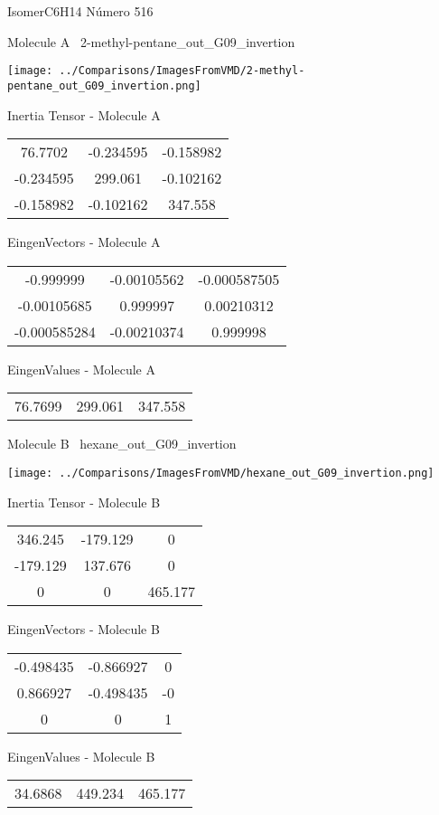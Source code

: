 \vtab[-3cm]
\begin{center}
{\large IsomerC6H14 \tab Número 516}
\end{center}
\begin{multicols}{2}
\begin{center}

Molecule A \
2-methyl-pentane\_out\_G09\_invertion

\texttt{[image: ../Comparisons/ImagesFromVMD/2-methyl-pentane\_out\_G09\_invertion.png]}

Inertia Tensor - Molecule A \\
\begin{tabular}{|c c c|}
76.7702	 & 	-0.234595	 & 	-0.158982	 \\
-0.234595	 & 	299.061	 & 	-0.102162	 \\
-0.158982	 & 	-0.102162	 & 	347.558
\end{tabular}

\vtab
 EingenVectors - Molecule A     \\
\begin{tabular}{|c c c|}
-0.999999	 & 	-0.00105562	 & 	-0.000587505	 \\
-0.00105685	 & 	0.999997	 & 	0.00210312	 \\
-0.000585284	 & 	-0.00210374	 & 	0.999998
\end{tabular}

\vtab
 EingenValues - Molecule A     \\
\begin{tabular}{|c c c|}
76.7699	 & 	299.061	 & 	347.558	 \\
\end{tabular}
\columnbreak

Molecule B \
hexane\_out\_G09\_invertion

\texttt{[image: ../Comparisons/ImagesFromVMD/hexane\_out\_G09\_invertion.png]}

Inertia Tensor - Molecule B \\
\begin{tabular}{|c c c|}
346.245	 & 	-179.129	 & 	0	 \\
-179.129	 & 	137.676	 & 	0	 \\
0	 & 	0	 & 	465.177
\end{tabular}

\vtab
 EingenVectors - Molecule B     \\
\begin{tabular}{|c c c|}
-0.498435	 & 	-0.866927	 & 	0	 \\
0.866927	 & 	-0.498435	 & 	-0	 \\
0	 & 	0	 & 	1
\end{tabular}

\vtab
 EingenValues - Molecule B     \\
\begin{tabular}{|c c c|}
34.6868	 & 	449.234	 & 	465.177	 \\
\end{tabular}

\end{center}
\end{multicols}

